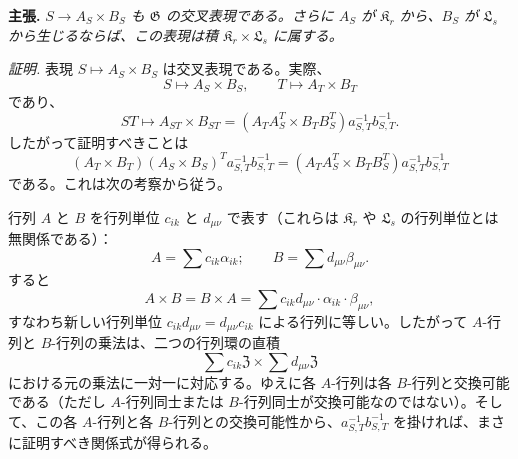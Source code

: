 \noindent\textbf{主張.} \emph{\(S\to A_S\times B_S\) も \(\mathfrak G\) の交叉表現である。さらに \(A_S\) が \(\mathfrak K_r\) から、\(B_S\) が \(\mathfrak L_s\) から生じるならば、この表現は積 \(\mathfrak K_r\times\mathfrak L_s\) に属する。}

\noindent\emph{証明.} 表現 \(S\mapsto A_S\times B_S\) は交叉表現である。実際、
\[
S\mapsto A_S\times B_S,\qquad
T\mapsto A_T\times B_T
\]
であり、
\[
ST\mapsto A_{ST}\times B_{ST}
=(A_TA_S^T\times B_TB_S^T)a_{S,T}^{-1}b_{S,T}^{-1}.
\]
したがって証明すべきことは
\[
(A_T\times B_T)(A_S\times B_S)^T a_{S,T}^{-1}b_{S,T}^{-1}
=(A_TA_S^T\times B_TB_S^T)a_{S,T}^{-1}b_{S,T}^{-1}
\]
である。これは次の考察から従う。

行列 \(A\) と \(B\) を行列単位 \(c_{ik}\) と \(d_{\mu\nu}\) で表す（これらは \(\mathfrak K_r\) や \(\mathfrak L_s\) の行列単位とは無関係である）：
\[
A=\sum c_{ik}\alpha_{ik};\qquad
B=\sum d_{\mu\nu}\beta_{\mu\nu}.
\]
すると
\[
A\times B=B\times A
=\sum c_{ik}d_{\mu\nu}\cdot\alpha_{ik}\cdot\beta_{\mu\nu},
\]
すなわち新しい行列単位 \(c_{ik}d_{\mu\nu}=d_{\mu\nu}c_{ik}\) による行列に等しい。したがって \(A\)-行列と \(B\)-行列の乗法は、二つの行列環の直積
\[
\sum c_{ik}\mathfrak Z\times\sum d_{\mu\nu}\mathfrak Z
\]
における元の乗法に一対一に対応する。ゆえに各 \(A\)-行列は各 \(B\)-行列と交換可能である（ただし \(A\)-行列同士または \(B\)-行列同士が交換可能なのではない）。そして、この各 \(A\)-行列と各 \(B\)-行列との交換可能性から、\(a_{S,T}^{-1}b_{S,T}^{-1}\) を掛ければ、まさに証明すべき関係式が得られる。
